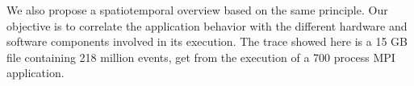 \hfill
\begin{minipage}[c]{0.38\textwidth}
We also propose a spatiotemporal overview based on 
the same principle. Our objective is to correlate the application 
behavior with the different hardware and software components involved in its 
execution. The trace showed here is a 15 GB file containing 218 million 
events, get from the execution of a 700 process MPI application.
\end{minipage}
\vfill

